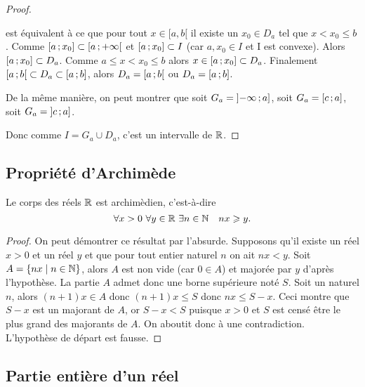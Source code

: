 \begin{proof}
\begin{itemize}
\begin{itemize}
          est équivalent à ce que pour tout \(x\in[a,b[\) il existe un \(x_0\in 
          D_a\) tel que \(x<x_0 \leqslant b\). Comme 
          \(\left[ a \, ;  x_0 \right]\subset \left[ a \, ;  +\infty \right[\) et 
          \(\left[ a \, ;  x_0 \right]\subset I\) (car \(a,x_0 \in I\) et I est 
          convexe). Alors \(\left[ a \, ;  x_0 \right] \subset D_a\). Comme 
          \(a\leqslant x < x_0\leqslant b\) alors \(x\in 
          \left[ a \, ;  x_0 \right]\subset D_a\). Finalement 
          \(\left[ a \, ;  b \right[\subset D_a \subset \left[ a \, ;  b \right]\), alors 
          \(D_a=\left[ a \, ;  b \right[\) ou \(D_a=\left[ a \, ;  b \right]\).
      \end{itemize}
      De la même manière, on peut montrer que soit 
      \(G_a=\left] -\infty \, ;  a \right]\), soit \(G_a=\left[ c \, ;  a \right]\), soit 
      \(G_a=\left] c \, ;  a \right]\).
  \end{itemize}
  Donc comme \(I=G_a\cup D_a\), c'est un intervalle de \(\mathbb{R}\).
\end{proof}

\subsection{Propriété d'Archimède}
\begin{prop}
  Le corps des réels \(\mathbb{R}\) est archimèdien, c'est-à-dire
  \begin{equation}
    \forall x>0 \ \forall y\in \R \ \exists n\in \N \quad nx\geqslant y.
  \end{equation}
\end{prop}
\begin{proof}
  On peut démontrer ce résultat par l'absurde. Supposons qu'il existe un réel 
  \(x>0\) et un réel \(y\) et que pour tout entier naturel \(n\) on ait 
  \(nx<y\). Soit \(A=\left\{nx\mathrel{}\middle|\mathrel{}n\in \mathbb{N}\right\}\), alors \(A\) est non vide (car \(0\in 
  A\)) et majorée par \(y\) d'après l'hypothèse. La partie \(A\) admet donc une 
  borne supérieure noté \(S\). Soit un naturel \(n\), alors \((n+1)x \in A\) 
  donc \((n+1)x\leqslant S\) donc \(nx \leqslant S-x\). Ceci montre que \(S-x\) 
  est un majorant de \(A\), or \(S-x<S\) puisque \(x>0\) et \(S\) est censé être 
  le plus grand des majorants de \(A\). On aboutit donc à une contradiction. 
  L'hypothèse de départ est fausse.
\end{proof}

\subsection{Partie entière d'un réel}

